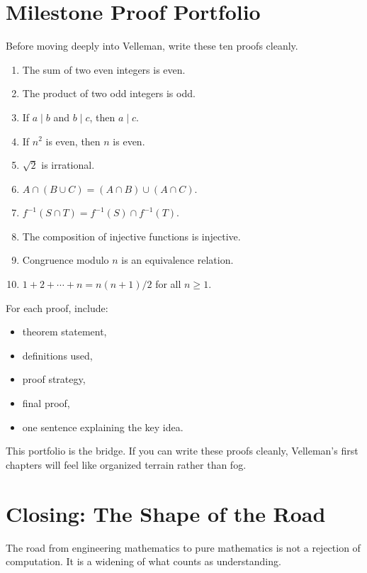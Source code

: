 \documentclass[11pt]{article}
\begin{document}
\newpage
\section{Milestone Proof Portfolio}

Before moving deeply into Velleman, write these ten proofs cleanly.

\begin{enumerate}
\item The sum of two even integers is even.
\item The product of two odd integers is odd.
\item If $a\mid b$ and $b\mid c$, then $a\mid c$.
\item If $n^2$ is even, then $n$ is even.
\item $\sqrt2$ is irrational.
\item $A\cap(B\cup C)=(A\cap B)\cup(A\cap C)$.
\item $f^{-1}(S\cap T)=f^{-1}(S)\cap f^{-1}(T)$.
\item The composition of injective functions is injective.
\item Congruence modulo $n$ is an equivalence relation.
\item $1+2+\cdots+n=n(n+1)/2$ for all $n\geq1$.
\end{enumerate}

For each proof, include:

\begin{itemize}
\item theorem statement,
\item definitions used,
\item proof strategy,
\item final proof,
\item one sentence explaining the key idea.
\end{itemize}

\begin{focusbox}
This portfolio is the bridge. If you can write these proofs cleanly, Velleman's first chapters will feel like organized terrain rather than fog.
\end{focusbox}

\newpage
\section{Closing: The Shape of the Road}

The road from engineering mathematics to pure mathematics is not a rejection of computation. It is a widening of what counts as understanding.
\end{document}
